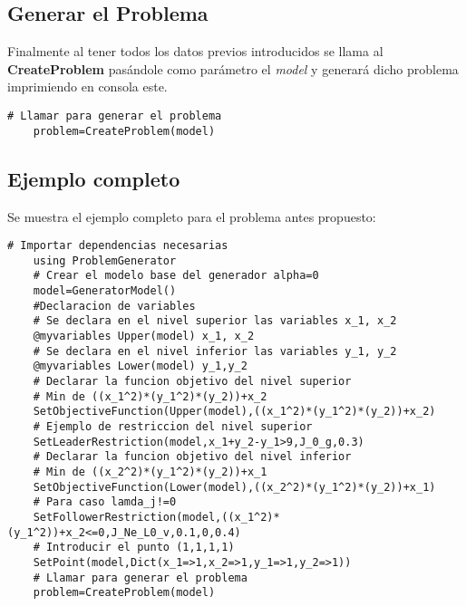 \subsection{Generar el Problema}
Finalmente al tener todos los datos previos introducidos se llama al \textbf{CreateProblem} pasándole como parámetro el \textit{model} 
y generará dicho problema imprimiendo en consola este.

\begin{lstlisting}[caption={Generar el problema}]
    # Llamar para generar el problema
    problem=CreateProblem(model)
\end{lstlisting}

    
\subsection{Ejemplo completo}
Se muestra el ejemplo completo para el problema antes propuesto:
\begin{lstlisting}[caption={Script}]
    # Importar dependencias necesarias
    using ProblemGenerator
    # Crear el modelo base del generador alpha=0
    model=GeneratorModel()
    #Declaracion de variables
    # Se declara en el nivel superior las variables x_1, x_2
    @myvariables Upper(model) x_1, x_2
    # Se declara en el nivel inferior las variables y_1, y_2
    @myvariables Lower(model) y_1,y_2
    # Declarar la funcion objetivo del nivel superior
    # Min de ((x_1^2)*(y_1^2)*(y_2))+x_2
    SetObjectiveFunction(Upper(model),((x_1^2)*(y_1^2)*(y_2))+x_2)
    # Ejemplo de restriccion del nivel superior
    SetLeaderRestriction(model,x_1+y_2-y_1>9,J_0_g,0.3)
    # Declarar la funcion objetivo del nivel inferior
    # Min de ((x_2^2)*(y_1^2)*(y_2))+x_1
    SetObjectiveFunction(Lower(model),((x_2^2)*(y_1^2)*(y_2))+x_1)
    # Para caso lamda_j!=0
    SetFollowerRestriction(model,((x_1^2)*(y_1^2))+x_2<=0,J_Ne_L0_v,0.1,0,0.4)
    # Introducir el punto (1,1,1,1)
    SetPoint(model,Dict(x_1=>1,x_2=>1,y_1=>1,y_2=>1))
    # Llamar para generar el problema
    problem=CreateProblem(model)
\end{lstlisting}


